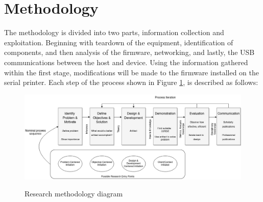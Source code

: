 

\section{Methodology}  \label{methodology}

The methodology is divided into two parts, information collection and exploitation. Beginning with teardown of the equipment, identification of components, and then analysis of the firmware, networking, and lastly, the USB communications between the host and device. Using the information gathered within the first stage, modifications will be made to the firmware installed on the serial printer. Each step of the process shown in Figure \ref{fig:methodology_diagram}, is described as follows:

\begin{figure}[ht]
  \centering
  {\includegraphics[width=148mm,scale=0.8]
  {Figures/methodology_diagram_corrected.png}}
  \caption{Research methodology diagram \autocite{peffersDesignScienceResearch2007}}
  \label{fig:methodology_diagram}
\end{figure}

